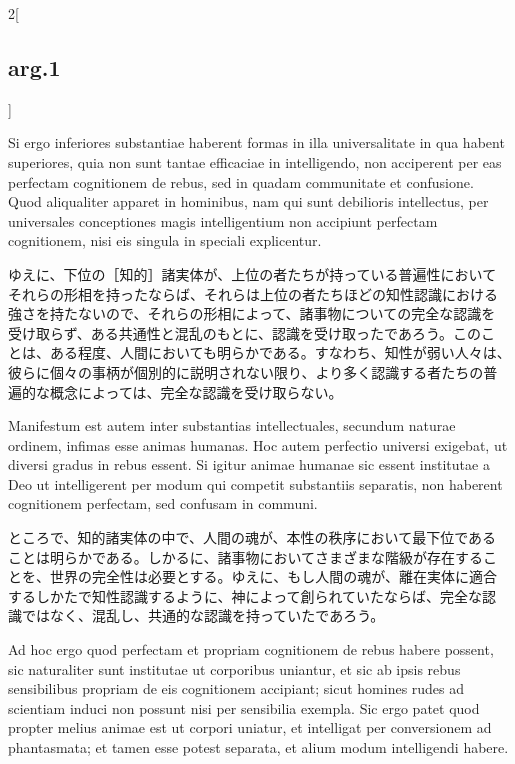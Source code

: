 \documentclass[paper=a4paper,fontsize=10pt,jafontsize=9pt,titlepage]{jlreq}
\begin{document}
\begin{paracol}{2}[\subsection{arg.1}]
\switchcolumn*

Si ergo inferiores substantiae haberent formas in illa universalitate
in qua habent superiores, quia non sunt tantae efficaciae in
intelligendo, non acciperent per eas perfectam cognitionem de rebus,
sed in quadam communitate et confusione. Quod aliqualiter apparet in
hominibus, nam qui sunt debilioris intellectus, per universales
conceptiones magis intelligentium non accipiunt perfectam cognitionem,
nisi eis singula in speciali explicentur.

\switchcolumn

ゆえに、下位の［知的］諸実体が、上位の者たちが持っている普遍性において
それらの形相を持ったならば、それらは上位の者たちほどの知性認識における
強さを持たないので、それらの形相によって、諸事物についての完全な認識を
受け取らず、ある共通性と混乱のもとに、認識を受け取ったであろう。このこ
とは、ある程度、人間においても明らかである。すなわち、知性が弱い人々は、
彼らに個々の事柄が個別的に説明されない限り、より多く認識する者たちの普
遍的な概念によっては、完全な認識を受け取らない。

\switchcolumn*

Manifestum est autem inter substantias intellectuales, secundum
naturae ordinem, infimas esse animas humanas. Hoc autem perfectio
universi exigebat, ut diversi gradus in rebus essent. Si igitur animae
humanae sic essent institutae a Deo ut intelligerent per modum qui
competit substantiis separatis, non haberent cognitionem perfectam,
sed confusam in communi.

\switchcolumn

ところで、知的諸実体の中で、人間の魂が、本性の秩序において最下位である
ことは明らかである。しかるに、諸事物においてさまざまな階級が存在するこ
とを、世界の完全性は必要とする。ゆえに、もし人間の魂が、離在実体に適合
するしかたで知性認識するように、神によって創られていたならば、完全な認
識ではなく、混乱し、共通的な認識を持っていたであろう。

\switchcolumn*

Ad hoc ergo quod perfectam et propriam cognitionem de rebus habere
possent, sic naturaliter sunt institutae ut corporibus uniantur, et
sic ab ipsis rebus sensibilibus propriam de eis cognitionem accipiant;
sicut homines rudes
ad scientiam induci non possunt nisi per sensibilia exempla. Sic ergo
patet quod propter melius animae est ut corpori uniatur, et intelligat
per conversionem ad phantasmata; et tamen esse potest separata, et
alium modum intelligendi habere.


\end{paracol}
\end{document}
